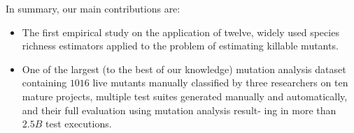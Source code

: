 \documentclass[sigconf,review,anonymous]{acmart}
\newcommand{\estimatorCount}{twelve\xspace}
\newcounter{todocounter}
\newcommand{\todo}[1]{\marginpar{$|$}\textcolor{red}{\stepcounter{todocounter}\footnote[\thetodocounter]{\textcolor{red}{\textbf{TODO }}\textit{#1}}}}
\newcommand{\Randoop}{\textsc{Randoop}\xspace}
\newcommand{\Evosuite}{\textsc{EvoSuite}\xspace}
\newcommand{\original}{\textsc{Original}\xspace}
\newcommand{\EvosuiteRandom}{\textsc{Random}\xspace}
\newcommand{\EvosuiteDynamosa}{\textsc{DynaMOSA}\xspace}
\renewcommand{\todo}[1]{}
\begin{document}
In summary, our main contributions are:
\begin{itemize}
   \item The first empirical study on the application of \estimatorCount,
         widely used species richness estimators applied to the problem of estimating killable mutants.
   \item One of the largest (to the best of our knowledge) mutation
analysis dataset containing $1016$ live mutants manually
classified by three researchers on ten mature projects,
multiple test suites generated manually and automatically,
and their full evaluation using mutation analysis result-
ing in more than $2.5B$ test executions.
\end{itemize}



\end{document}
